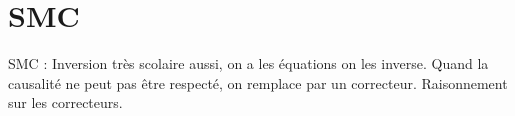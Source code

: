 \section{SMC}
SMC : 
Inversion très scolaire aussi, on a les équations on les inverse. Quand la causalité ne peut pas être respecté, on remplace par un correcteur.
Raisonnement sur les correcteurs.

